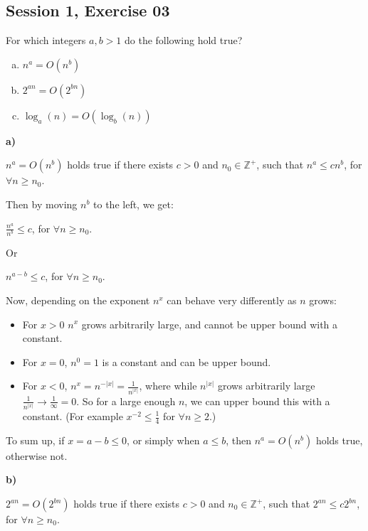 \subsection{Session 1, Exercise 03}


For which integers $a,b > 1$ do the following hold true?

\begin{enumerate}[a.)]
\item $n^a = O(n^b)$
\item $2^{an} = O(2^{bn})$
\item $\log_a(n) = O(\log_b(n))$
\end{enumerate}


 \textbf{a)}

$n^a = O(n^b)$ holds true if there exists $c>0$ and $n_0\in{}\mathds{Z}^+$, such that $n^a \leq{} cn^b$, for $\forall{}n\geq{}n_0$.

Then by moving $n^b$ to the left, we get:

$\frac{n^a}{n^b} \leq{} c$, for $\forall{}n\geq{}n_0$.

Or

$n^{a-b}\leq{} c$, for $\forall{}n\geq{}n_0$.

Now, depending on the exponent $n^{x}$ can behave very differently as $n$ grows:

\begin{itemize}
    \item For $x > 0$ $n^{x}$ grows arbitrarily large, and cannot be upper bound with a constant.
    \item For $x=0$, $n^0 = 1$ is a constant and can be upper bound.
    \item For $x<0$, $n^{x} = n^{-|x|} = \frac{1}{n^{|x|}}$, where while $n^{|x|}$ grows arbitrarily large $\frac{1}{n^{|x|}} \rightarrow \frac{1}{\infty} = 0$. So for a large enough $n$, we can upper bound this with a constant. (For example $x^{-2} \leq{} \frac{1}{4}$ for $\forall{}n\geq{}2$.)
\end{itemize}

To sum up, if $x = a-b \leq{} 0$, or simply when $a\leq{}b$, then $n^a = O(n^b)$ holds true, otherwise not.

\textbf{b)}

$2^{an} = O(2^{bn})$ holds true if there exists $c>0$ and $n_0\in{}\mathds{Z}^+$, such that $2^{an} \leq{} c2^{bn}$, for $\forall{}n\geq{}n_0$.

